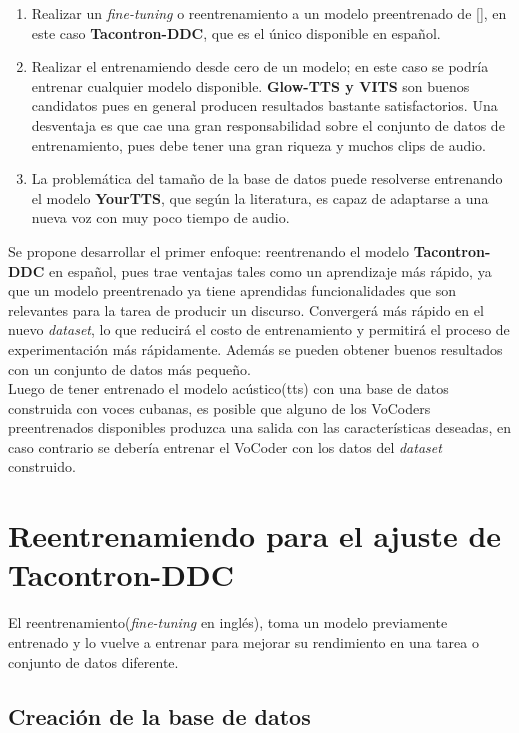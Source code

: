 \begin{enumerate}
	\item Realizar un \textit{fine-tuning} o reentrenamiento a un modelo preentrenado de [\cite{coqui-doc}], en este caso \textbf{Tacontron-DDC}, que es el único disponible en español. 
	
	\item Realizar el entrenamiendo desde cero de un modelo; en este caso se podría entrenar cualquier modelo disponible. \textbf{Glow-TTS y VITS} son buenos candidatos pues en general producen resultados bastante satisfactorios. Una desventaja es que cae una gran responsabilidad sobre el conjunto de datos de entrenamiento, pues debe tener una gran riqueza y muchos clips de audio.
	
	\item La problemática del tamaño de la base de datos puede resolverse entrenando el modelo \textbf{YourTTS}, que según la literatura, es capaz de adaptarse a una nueva voz con muy poco tiempo de audio.
\end{enumerate}

Se propone desarrollar el primer enfoque: reentrenando el modelo \textbf{Tacontron-DDC} en español, pues trae ventajas tales como un aprendizaje más rápido, ya que un modelo preentrenado ya tiene aprendidas funcionalidades que son relevantes para la tarea de producir un discurso. Convergerá más rápido en el nuevo \textit{dataset}, lo que reducirá el costo de entrenamiento y permitirá el proceso de experimentación más rápidamente. Además se pueden obtener buenos resultados con un conjunto de datos más pequeño.  \\

Luego de tener entrenado el modelo acústico(tts) con una base de datos construida con voces cubanas, es posible que alguno de los VoCoders preentrenados disponibles produzca una salida con las características deseadas, en caso contrario se debería entrenar el VoCoder con los datos del \textit{dataset} construido.

\section{Reentrenamiendo para el ajuste de Tacontron-DDC}

El reentrenamiento(\textit{fine-tuning} en inglés), toma un modelo previamente entrenado y lo vuelve a entrenar para mejorar su rendimiento en una tarea o conjunto de datos diferente.

\subsection{Creación de la base de datos}

